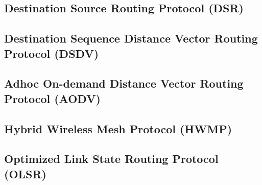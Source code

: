\documentclass[12pt,a4paper]{report}
\begin{document}
\subsection{Destination Source Routing Protocol (DSR)}
\subsection{Destination Sequence Distance Vector Routing Protocol (DSDV)}
\subsection{Adhoc On-demand Distance Vector Routing Protocol (AODV)}
\subsection{Hybrid Wireless Mesh Protocol (HWMP)}
\subsection{Optimized Link State Routing Protocol (OLSR)}

\end{document}
